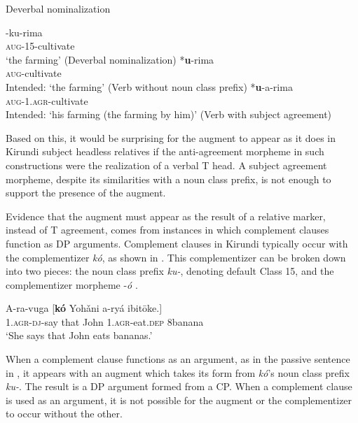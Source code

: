 \documentclass[output=paper,colorlinks,citecolor=brown
]{langscibook}
\begin{document}
\ea Deverbal nominalization \label{ex:myers:augnc}
\begin{xlist}
\ex \label{ex:myers:uku} \gll {}-ku-rima\\
\textsc{aug}-15-cultivate\\
\glt {}`the farming' \hfill{(Deverbal nominalization)}
\ex \label{ex:myers:uri} \gll {}*{\bfseries  u}-rima\\
\textsc{aug}-cultivate\\
\glt {}Intended: `the farming' \hfill{(Verb without noun class prefix)}
\ex \label{ex:myers:ua} \gll {}*{\bfseries  u}-a-rima\\
\textsc{aug}-\textsc{1.agr}-cultivate\\
\glt {}Intended: `his farming (the farming by him)' \hfill{(Verb with subject agreement)}
\end{xlist}
\z

\noindent Based on this, it would be surprising for the augment to appear as it does in Kirundi subject headless relatives if the anti-agreement morpheme in such constructions were the realization of a verbal T head. A subject agreement morpheme, despite its similarities with a noun class prefix, is not enough to support the presence of the augment.

Evidence that the augment must appear as the result of a relative marker, instead of T agreement, comes from instances in which complement clauses function as DP arguments. Complement clauses in Kirundi typically occur with the complementizer \emph{kó}, as shown in . This complementizer can be broken down into two pieces: the noun class prefix \emph{ku-}, denoting default Class 15, and the complementizer morpheme -\emph{ó} \citep{Morgunova:2023}.

\ea
\label{ex:myers:ko} \gll A-ra-vuga [{\bfseries  kó} Yohǎni a-ryá ibitōke.]\\
\textsc{1.agr-dj}-say that John \textsc{1.agr}-eat.\textsc{dep} 8banana\\
\glt `She says that John eats bananas.'
\z

When a complement clause functions as an argument, as in the passive sentence in , it appears with an augment which takes its form from \emph{kó}'s noun class prefix \emph{ku-}. The result is a DP argument formed from a CP. When a complement clause is used as an argument, it is not possible for the augment or the complementizer to occur without the other.
\end{document}
